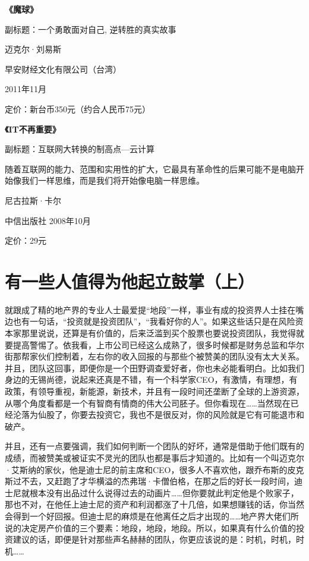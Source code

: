 \textbf{《魔球》}

副标题：一个勇敢面对自己, 逆转胜的真实故事

迈克尔·刘易斯

早安财经文化有限公司（台湾）

2011年11月

定价：新台币350元（约合人民币75元）

\textbf{《IT不再重要》}

副标题：互联网大转换的制高点---云计算

随着互联网的能力、范围和实用性的扩大，它最具有革命性的后果可能不是电脑开始像我们一样思维，而是我们将开始像电脑一样思维。

尼古拉斯·卡尔

中信出版社 2008年10月

定价：29元

\hypertarget{ux6709ux4e00ux4e9bux4ebaux503cux5f97ux4e3aux4ed6ux8d77ux7acbux9f13ux638cux4e0a}{%
\section{有一些人值得为他起立鼓掌（上）}\label{ux6709ux4e00ux4e9bux4ebaux503cux5f97ux4e3aux4ed6ux8d77ux7acbux9f13ux638cux4e0a}}

就跟成了精的地产界的专业人士最爱提``地段''一样，事业有成的投资界人士挂在嘴边也有一句话，``投资就是投资团队''，``我看好你的人''。如果这些话只是在风险资本家那里说说，还算是有价值的，后来泛滥到买个股票也要说投资团队，我觉得就要提高警惕了。依我看，上市公司已经这么成熟了，很多时候都是财务总监和华尔街那帮家伙们控制着，左右你的收入回报的与那些个被赞美的团队没有太大关系。并且，团队这回事，即便你是一个田野调查爱好者，你也未必能看明白。比如我们身边的无锡尚德，说起来还真是不错，有一个科学家CEO，有激情，有理想，有政策，有领导重视，新能源，新技术，并且有一段时间还垄断了全球的上游资源，从哪个角度看都是一个有智商有情商的伟大公司胚子。但你看现在\ldots\ldots 当然现在已经沦落为仙股了，你要去投资它，我也不是很反对，你的风险就是它有可能退市和破产。

并且，还有一点要强调，我们如何判断一个团队的好坏，通常是借助于他们既有的成绩，而被赞美或被证实不灵光的团队也都是事后才知道的。比如有一个叫迈克尔·艾斯纳的家伙，他是迪士尼的前主席和CEO，很多人不喜欢他，跟乔布斯的皮克斯过不去，又赶跑了才华横溢的杰弗瑞·卡僧伯格，在那之后的好长一段时间，迪士尼就根本没有出品过什么说得过去的动画片\ldots\ldots 但你要就此判定他是个败家子，那也不对，在他任上迪士尼的资产和利润都涨了十几倍，如果想赚钱的话，你当然会得到一个好回报。但迪士尼的麻烦是在他离任之后才出现的\ldots\ldots 地产界大佬们所说的决定房产价值的三个要素：地段，地段，地段。所以，如果真有什么价值的投资建议的话，即便是针对那些声名赫赫的团队，你更应该说的是：时机，时机，时机\ldots\ldots{}

